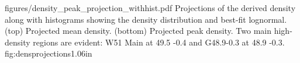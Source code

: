 % 
% 
% 
% 


            {figures/density_peak_projection_withhist.pdf}
{Projections of the derived density along with histograms
showing the density distribution and best-fit lognormal.
(top) Projected mean density.
(bottom) Projected peak density.
Two main high-density regions are evident: W51 Main at 49.5 -0.4 and G48.9-0.3 at 48.9 -0.3.}
{fig:densprojections}{1.0}{6in}

